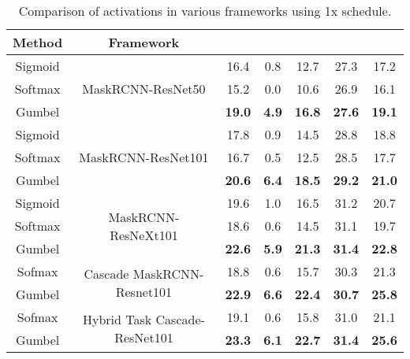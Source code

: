 \documentclass[runningheads]{llncs}
\begin{document}
\begin{table}
    \centering
    \caption{Comparison of activations in various frameworks using 1x schedule.}
    \begin{tabular}{c|c|c|c|c|c|c}
         Method& Framework&  &  &  &  &  \\
         \hline
         Sigmoid& \multirow{ 3}{*}{MaskRCNN-ResNet50\cite{he2017mask}} &16.4 &0.8 &12.7 &27.3 &17.2 \\
         Softmax& &15.2 & 0.0& 10.6 &26.9&16.1\\
         Gumbel& & \textbf{19.0}&\textbf{4.9}&\textbf{16.8}&\textbf{27.6}&\textbf{19.1}\\
         \hline
         Sigmoid& \multirow{ 3}{*}{MaskRCNN-ResNet101} &17.8 &0.9 &14.5 &28.8 &18.8\\
         Softmax& &16.7 & 0.5& 12.5 &28.5&17.7\\
         Gumbel& & \textbf{20.6}&\textbf{6.4}&\textbf{18.5}&\textbf{29.2}&\textbf{21.0}\\
         \hline
         Sigmoid&\multirow{ 3}{*}{MaskRCNN-ResNeXt101} &19.6 &1.0&16.5 &31.2&20.7\\
         Softmax& &18.6 &0.6&14.5 &31.1&19.7\\
         Gumbel& & \textbf{22.6}&\textbf{5.9}&\textbf{21.3}&\textbf{31.4}&\textbf{22.8}\\
         \hline
         Sofmax&\multirow{ 2}{*}{Cascade MaskRCNN-Resnet101\cite{cai2019cascade}}  &18.8  &0.6 &15.7 &30.3 &21.3\\
         Gumbel& & \textbf{22.9} &\textbf{6.6}&\textbf{22.4}&\textbf{30.7}&\textbf{25.8}\\
         \hline
         Sofmax&\multirow{ 2}{*}{Hybrid Task Cascade-ResNet101\cite{chen2019hybrid}}  &19.1  &0.6  &15.8  &31.0 &21.1\\
         Gumbel& &\textbf{23.3}&\textbf{6.1} &\textbf{22.7}&\textbf{31.4}&\textbf{25.6}\\
    \end{tabular}
    \label{tab:detailed_larger_models}
\end{table}
\end{document}
